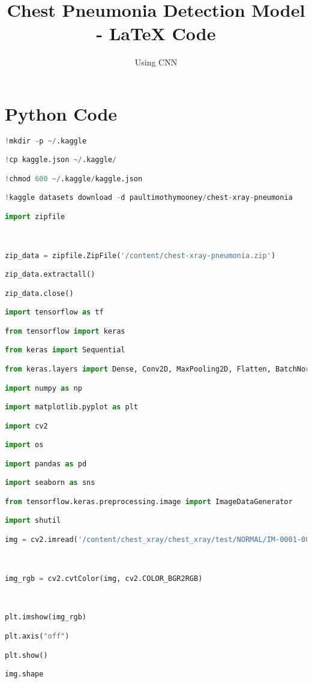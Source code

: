 \documentclass{article}
\begin{document}
\title{Chest Pneumonia Detection Model - LaTeX Code}
\author{Using CNN}
\maketitle

\section*{Python Code}

\begin{lstlisting}[style=mystyle,language=Python]
 !mkdir -p ~/.kaggle

!cp kaggle.json ~/.kaggle/

!chmod 600 ~/.kaggle/kaggle.json

!kaggle datasets download -d paultimothymooney/chest-xray-pneumonia

import zipfile



zip_data = zipfile.ZipFile('/content/chest-xray-pneumonia.zip')

zip_data.extractall()

zip_data.close()

import tensorflow as tf

from tensorflow import keras

from keras import Sequential

from keras.layers import Dense, Conv2D, MaxPooling2D, Flatten, BatchNormalization, Dropout

import numpy as np

import matplotlib.pyplot as plt

import cv2

import os

import pandas as pd

import seaborn as sns

from tensorflow.keras.preprocessing.image import ImageDataGenerator

import shutil

img = cv2.imread('/content/chest_xray/chest_xray/test/NORMAL/IM-0001-0001.jpeg')



img_rgb = cv2.cvtColor(img, cv2.COLOR_BGR2RGB)



plt.imshow(img_rgb)

plt.axis("off")

plt.show()

img.shape


\end{lstlisting}
\end{document}
